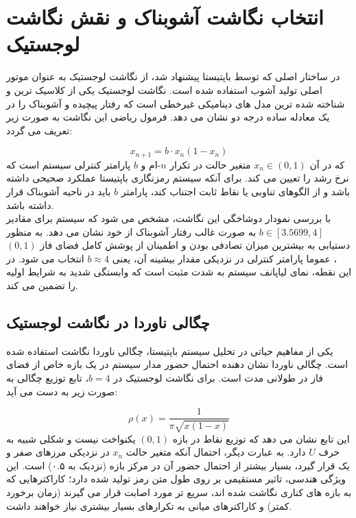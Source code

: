 \documentclass[12pt]{report}
\begin{document}
\newpage

\section{انتخاب نگاشت آشوبناک و نقش نگاشت لوجستیک}
در ساختار اصلی که توسط باپتیستا پیشنهاد شد، از نگاشت لوجستیک به عنوان 
موتور اصلی تولید آشوب استفاده شده است. نگاشت لوجستیک یکی از کلاسیک ترین و شناخته شده ترین مدل های 
دینامیکی غیرخطی است که رفتار پیچیده و آشوبناک را در یک معادله ساده درجه دو نشان می دهد. فرمول 
ریاضی این نگاشت به صورت زیر تعریف می گردد:

\begin{equation}
    x_{n+1} = b \cdot x_n (1 - x_n)
\end{equation}
\noindent
که در آن $x_n \in (0, 1)$ متغیر حالت در تکرار $n$-ام و $b$ پارامتر کنترلی سیستم است که نرخ رشد 
را تعیین می کند. برای آنکه سیستم رمزنگاری باپتیستا عملکرد صحیحی داشته باشد و از الگوهای تناوبی 
یا نقاط ثابت اجتناب کند، پارامتر $b$ باید در ناحیه آشوبناک قرار داشته باشد. 
\\\noindent
با بررسی نمودار دوشاخگی این نگاشت، مشخص می شود که سیستم برای 
مقادیر $b \in [3.5699, 4]$ به صورت غالب رفتار آشوبناک از خود نشان می دهد. به منظور دستیابی به 
بیشترین میزان تصادفی بودن و اطمینان از پوشش کامل فضای فاز $(0, 1)$، عموما پارامتر کنترلی در 
نزدیکی مقدار بیشینه آن، یعنی $b \approx 4$ انتخاب می شود. در این نقطه، نمای لیاپانف
 سیستم به شدت مثبت است که وابستگی شدید به شرایط اولیه را 
تضمین می کند.

\subsection{چگالی ناوردا در نگاشت لوجستیک}
یکی از مفاهیم حیاتی در تحلیل سیستم باپتیستا، چگالی ناوردا 
نگاشت استفاده شده است. چگالی ناوردا نشان دهنده احتمال حضور مدار سیستم در یک بازه خاص از فضای فاز 
در طولانی مدت است. برای نگاشت لوجستیک در $b = 4$، تابع توزیع چگالی به صورت زیر به دست می آید:

\begin{equation}
    \rho(x) = \frac{1}{\pi \sqrt{x(1-x)}}
\end{equation}
\noindent
این تابع نشان می دهد که توزیع نقاط در بازه $(0, 1)$ یکنواخت نیست و شکلی شبیه به حرف $U$ دارد. 
به عبارت دیگر، احتمال آنکه متغیر حالت $x_n$ در نزدیکی مرزهای صفر و یک قرار گیرد، بسیار بیشتر از 
احتمال حضور آن در مرکز بازه (نزدیک به ۰.۵) است. این ویژگی هندسی، تاثیر مستقیمی بر روی طول متن رمز 
تولید شده دارد؛ کاراکترهایی که به بازه های کناری نگاشت شده اند، سریع تر مورد اصابت قرار می گیرند 
(زمان برخورد کمتر) و کاراکترهای میانی به تکرارهای بسیار بیشتری نیاز خواهند داشت.
\end{document}
